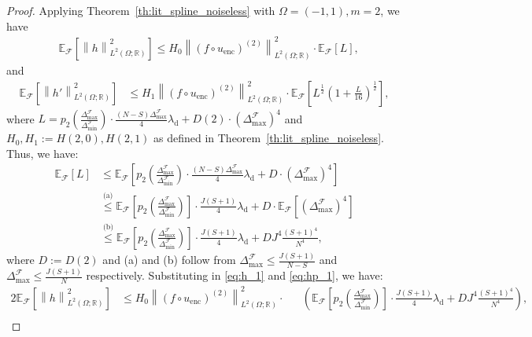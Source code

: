 \documentclass{article}
\def\encs{u_\textrm{enc}}
\def\declamb{\lambda_\textrm{d}}
\def\stset{\mathcal{F}}
\newcommand{\norm}[1]{\left\lVert#1\right\rVert}
\newcommand{\lp}[1]{{L}^{#1}\left(\Omega; \mathbb{R}\right)}
\newcommand{\lec}[2]{\stackrel{\text{#1}}{#2}}
\begin{document}
\begin{proof}
Applying Theorem~\ref{th:lit_spline_noiseless} with $\Omega=(-1, 1), m=2$, we have
\begin{align}\label{eq:h_1}
    &\mathbb{E}_{ \stset}\left[\norm{h}^2_{\lp{2}}\right] \lec{}{\leqslant}H_0\norm{(f\circ\encs)^{(2)}}^2_{\lp{2}}\cdot\mathbb{E}_{\stset}\left[L\right],
\end{align}
and
\begin{align}\label{eq:hp_1}
\mathbb{E}_{\stset}\left[\norm{h'}^2_{\lp{2}}\right] &\lec{}{\leqslant}H_1\norm{(f\circ\encs)^{(2)}}^2_{\lp{2}}\cdot\mathbb{E}_{\stset}\left[L^{\frac{1}{2}}(1 + \frac{L}{16})^{\frac{1}{2}}\right],
\end{align}
where $L=p_2\left(\frac{\Delta^\stset_\textrm{max}}{\Delta^\stset_\textrm{min}}\right)\cdot\frac{(N-S) \Delta^\stset_\textrm{max}}{4} \declamb + D(2)\cdot \left({\Delta^\stset_\textrm{max}}\right)^{4}$ and $H_0, H_1:= H(2,0), H(2,1)$ as defined in  Theorem~\ref{th:lit_spline_noiseless}. Thus, we have:
\begin{align}\label{eq:bound_L}
    \mathbb{E}_{\stset}[L] &\leqslant \mathbb{E}_{\stset}\left[p_2\left(\frac{\Delta^\stset_\textrm{max}}{\Delta^\stset_\textrm{min}}\right)\cdot\frac{(N-S) \Delta^\stset_\textrm{max}}{4} \declamb + D\cdot \left({\Delta^\stset_\textrm{max}}\right)^{4} \right] \nonumber \\ 
    &\lec{(a)}{\leqslant} \mathbb{E}_{\stset}\left[p_2\left(\frac{\Delta^\stset_\textrm{max}}{\Delta^\stset_\textrm{min}}\right)\right]\cdot\frac{J(S+1)}{4} \declamb + D\cdot \mathbb{E}_{\stset}\left[\left({\Delta^\stset_\textrm{max}}\right)^{4}\right] 
    \\ &\lec{(b)}{\leqslant} \mathbb{E}_{\stset}\left[p_2\left(\frac{\Delta^\stset_\textrm{max}}{\Delta^\stset_\textrm{min}}\right)\right]\cdot\frac{J(S+1)}{4} \declamb + DJ^4\frac{(S+1)^4}{N^4},
\end{align}
where $D:=D(2)$ and (a) and (b) follow from  $\Delta^\stset_\textrm{max} \leqslant \frac{J(S+1)}{N-S}$ and $\Delta^\stset_\textrm{max} \leqslant \frac{J(S+1)}{N}$ respectively. Substituting in \eqref{eq:h_1} and \eqref{eq:hp_1}, we have:
\begin{alignat}{2}
    \label{eq:h_noiseless_bound_1}
    \mathbb{E}_{\stset}\left[\norm{h}^2_{\lp{2}}\right] &\leqslant H_0\norm{(f\circ\encs)^{(2)}}^2_{\lp{2}}\cdot&&\left(\mathbb{E}_{\stset}\left[p_2\left(\frac{\Delta^\stset_\textrm{max}}{\Delta^\stset_\textrm{min}}\right)\right]\cdot\frac{J(S+1)}{4} \declamb + DJ^4\frac{(S+1)^4}{N^4}\right),  \\ \label{eq:hp_noiseless_bound_1}

\end{alignat}
\end{proof}
\end{document}
